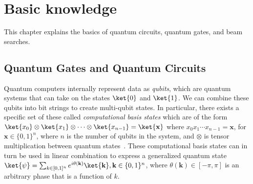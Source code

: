 \section{Basic knowledge}
This chapter explains the basics of quantum circuits, quantum gates, and beam searches.
\begin{figure}[t]
  \begin{minipage}[t]{.22\textwidth}
    \centering
    \scalebox{1.0}{
      
    }
    \centering
    \scalebox{1.0} {
      
    }
    \centering
    \scalebox{1.0} {
      
    }
  \end{minipage}
  \begin{minipage}[t]{.22\textwidth}
    \vspace{5mm}
    \centering
    \hspace{5mm}
    \centering
    \scalebox{1.0} {
      
    }
    \centering
    \scalebox{1.0} {
      
    }
  \end{minipage}
  \caption{}
  \label{fig-basis}
\end{figure}

\subsection{Quantum Gates and Quantum Circuits}
\label{Subsec:qubits}
Quantum computers internally represent data as \emph{qubits}, which are quantum systems that can
take on the states $\ket{0}$ and $\ket{1}$.  We can combine these qubits into bit strings to
create multi-qubit states. In particular, there exists a specific set of these called
\emph{computational basis states} which are of the form $\ket{x_0}\otimes\ket{x_1}\otimes\cdots\otimes\ket{x_{n-1}}=\ket{\mathbf{x}}$ where $x_{0}x_{1}\cdots{x_{n-1}}=\mathbf{x}$, for $\mathbf{x} \in \{0,1\}^n$,
where $n$ is the number of qubits in the system, and $\otimes$ is tensor multiplication between quantum states~\cite{bib-mike-and-ike}. These computational basis states
can in turn be used in linear combination to express a generalized quantum state
$\ket{\psi} = \sum_{k \in [0,1]^n} e^{i {\theta}(\mathbf{k})} \ket{\mathbf{k}}, \mathbf{k} \in \{0,1\}^n$, where ${\theta}(\mathbf{k})\in [-\pi,\pi]$ is
an arbitrary phase that is a function of $k$. 

